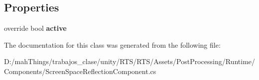 \subsection*{Properties}
\begin{DoxyCompactItemize}
\item 
\mbox{\label{class_unity_engine_1_1_post_processing_1_1_screen_space_reflection_component_aa8700a0b57b1a9d4a9d928af7fb3fbad}} 
override bool {\bfseries active}
\end{DoxyCompactItemize}


The documentation for this class was generated from the following file\+:\begin{DoxyCompactItemize}
\item 
D\+:/mah\+Things/trabajos\+\_\+clase/unity/\+R\+T\+S/\+R\+T\+S/\+Assets/\+Post\+Processing/\+Runtime/\+Components/Screen\+Space\+Reflection\+Component.\+cs\end{DoxyCompactItemize}
